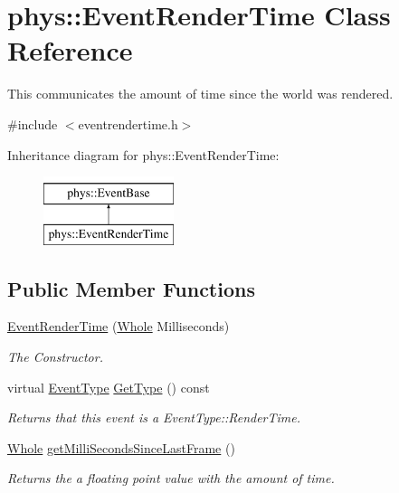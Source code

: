 \hypertarget{classphys_1_1EventRenderTime}{
\section{phys::EventRenderTime Class Reference}
\label{d3/d8b/classphys_1_1EventRenderTime}
}


This communicates the amount of time since the world was rendered.  




{\ttfamily \#include $<$eventrendertime.h$>$}

Inheritance diagram for phys::EventRenderTime:\begin{figure}[H]
\begin{center}
\leavevmode
\includegraphics[height=2cm]{d3/d8b/classphys_1_1EventRenderTime}
\end{center}
\end{figure}
\subsection*{Public Member Functions}
\begin{DoxyCompactItemize}
\item 
\hyperlink{classphys_1_1EventRenderTime_af2384f7b09bbea42dcd2539a9e1747fd}{EventRenderTime} (\hyperlink{namespacephys_a460f6bc24c8dd347b05e0366ae34f34a}{Whole} Milliseconds)
\begin{DoxyCompactList}\small\item\em The Constructor. \item\end{DoxyCompactList}\item 
virtual \hyperlink{classphys_1_1EventBase_a5e6a8564e127f654123f0bf6a2751923}{EventType} \hyperlink{classphys_1_1EventRenderTime_a160ca55bf9e5a2ae80dab82eab88baf5}{GetType} () const 
\begin{DoxyCompactList}\small\item\em Returns that this event is a EventType::RenderTime. \item\end{DoxyCompactList}\item 
\hyperlink{namespacephys_a460f6bc24c8dd347b05e0366ae34f34a}{Whole} \hyperlink{classphys_1_1EventRenderTime_ac9f20f13bf1f6e542151be2ce8ea2fa4}{getMilliSecondsSinceLastFrame} ()
\begin{DoxyCompactList}\small\item\em Returns the a floating point value with the amount of time. \item\end{DoxyCompactList}\end{DoxyCompactItemize}


